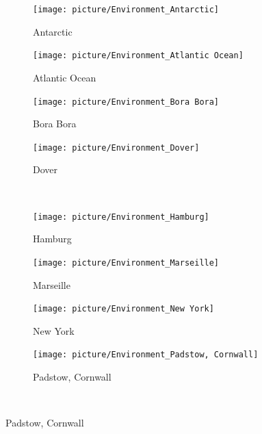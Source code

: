 \documentclass[letterpaper,10pt]{article}
\begin{document}
				\begin{figure}[htbp] 
					\centering 
					
					\begin{subfigure}{0.24\textwidth}
						\texttt{[image: picture/Environment\_Antarctic]}
						\captionsetup{font=scriptsize}
						\caption{Antarctic}
						\label{fig: Environment_Antarctic}
					\end{subfigure}
					\begin{subfigure}{0.24\textwidth}
						\texttt{[image: picture/Environment\_Atlantic Ocean]}
						\captionsetup{font=scriptsize}
						\caption{Atlantic Ocean}
						\label{fig: Environment_Atlantic Ocean}
					\end{subfigure}
					\begin{subfigure}{0.24\textwidth}
						\texttt{[image: picture/Environment\_Bora Bora]}
						\captionsetup{font=scriptsize}
						\caption{Bora Bora}
						\label{fig: Environment_Bora Bora}	
					\end{subfigure}
					\begin{subfigure}{0.24\textwidth}
						\texttt{[image: picture/Environment\_Dover]}
						\captionsetup{font=scriptsize}
						\caption{Dover}
						\label{fig: Environment_Dover}	
					\end{subfigure} \\

					\begin{subfigure}{0.24\textwidth}
						\texttt{[image: picture/Environment\_Hamburg]}
						\captionsetup{font=scriptsize}
						\caption{Hamburg}
						\label{fig: Environment_Hamburg}
					\end{subfigure}
					\begin{subfigure}{0.24\textwidth}
						\texttt{[image: picture/Environment\_Marseille]}
						\captionsetup{font=scriptsize}
						\caption{Marseille}
						\label{fig: Environment_Marseille}
					\end{subfigure}
					\begin{subfigure}{0.24\textwidth}
						\texttt{[image: picture/Environment\_New York]}
						\captionsetup{font=scriptsize}
						\caption{New York}
						\label{fig: Environment_New York}	
					\end{subfigure}
					\begin{subfigure}{0.24\textwidth}
						\texttt{[image: picture/Environment\_Padstow, Cornwall]}
						\captionsetup{font=scriptsize}
						\caption{Padstow, Cornwall}
						\label{fig: Environment_Padstow, Cornwall}	
					\end{subfigure} \\


\end{figure}
\end{document}
